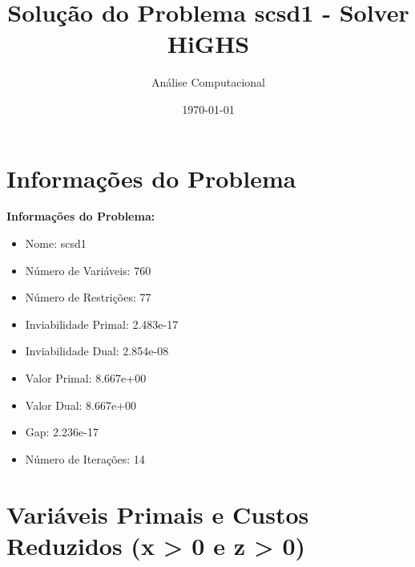 \documentclass[12pt]{article}
\title{Solução do Problema scsd1 - Solver HiGHS}
\author{Análise Computacional}
\date{\today}
\begin{document}
\maketitle

\section{Informações do Problema}

\textbf{Informações do Problema:}
\begin{itemize}
\item Nome: scsd1
\item Número de Variáveis: 760
\item Número de Restrições: 77
\item Inviabilidade Primal: 2.483e-17
\item Inviabilidade Dual: 2.854e-08
\item Valor Primal: 8.667e+00
\item Valor Dual: 8.667e+00
\item Gap: 2.236e-17
\item Número de Iterações: 14
\end{itemize}


\section{Variáveis Primais e Custos Reduzidos (x > 0 e z > 0)}
\end{document}

